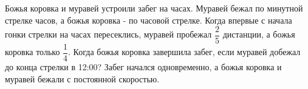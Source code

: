 \hspace{3mm}


 Божья коровка и муравей устроили забег на часах. Муравей бежал по минутной стрелке часов, а божья коровка - по часовой стрелке. Когда впервые с начала гонки стрелки на часах пересеклись, муравей пробежал $\dfrac{2}{5}$ дистанции, а божья коровка только $\dfrac{1}{4}$. Когда божья коровка завершила забег, если муравей добежал до конца стрелки в 12:00? Забег начался одновременно, а божья коровка и муравей бежали с постоянной скоростью.